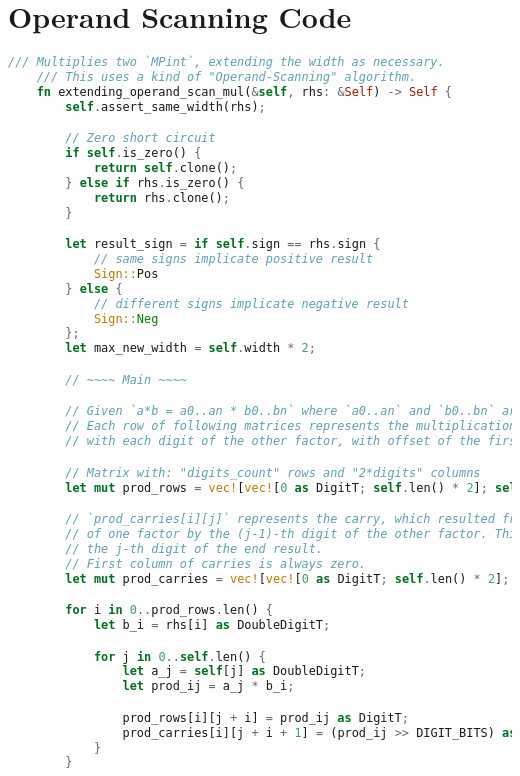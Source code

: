 
\appendix
\section{Operand Scanning Code} \label{apdx:opscan}
\begin{lstlisting}[language=Rust, style=boxed]
    /// Multiplies two `MPint`, extending the width as necessary.
    /// This uses a kind of "Operand-Scanning" algorithm.
    fn extending_operand_scan_mul(&self, rhs: &Self) -> Self {
        self.assert_same_width(rhs);

        // Zero short circuit
        if self.is_zero() {
            return self.clone();
        } else if rhs.is_zero() {
            return rhs.clone();
        }

        let result_sign = if self.sign == rhs.sign {
            // same signs implicate positive result
            Sign::Pos
        } else {
            // different signs implicate negative result
            Sign::Neg
        };
        let max_new_width = self.width * 2;

        // ~~~~ Main ~~~~

        // Given `a*b = a0..an * b0..bn` where `a0..an` and `b0..bn` are the digits of the factors.
        // Each row of following matrices represents the multiplication of a digit of one factor
        // with each digit of the other factor, with offset of the first factors digit-position.

        // Matrix with: "digits_count" rows and "2*digits" columns
        let mut prod_rows = vec![vec![0 as DigitT; self.len() * 2]; self.len()];

        // `prod_carries[i][j]` represents the carry, which resulted from multiplying the i-th digit
        // of one factor by the (j-1)-th digit of the other factor. This carry must then be added to
        // the j-th digit of the end result.
        // First column of carries is always zero.
        let mut prod_carries = vec![vec![0 as DigitT; self.len() * 2]; self.len()];

        for i in 0..prod_rows.len() {
            let b_i = rhs[i] as DoubleDigitT;

            for j in 0..self.len() {
                let a_j = self[j] as DoubleDigitT;
                let prod_ij = a_j * b_i;

                prod_rows[i][j + i] = prod_ij as DigitT;
                prod_carries[i][j + i + 1] = (prod_ij >> DIGIT_BITS) as DigitT;
            }
        }


\end{lstlisting}
